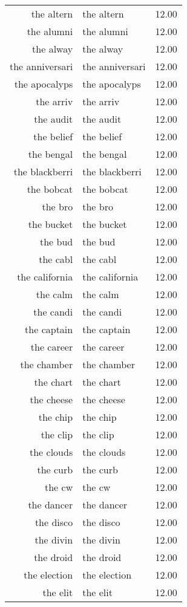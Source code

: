 \begin{table}[ht]
\begin{tabular}{rlr}
  the altern & the altern & 12.00 \\ 
  the alumni & the alumni & 12.00 \\ 
  the alway & the alway & 12.00 \\ 
  the anniversari & the anniversari & 12.00 \\ 
  the apocalyps & the apocalyps & 12.00 \\ 
  the arriv & the arriv & 12.00 \\ 
  the audit & the audit & 12.00 \\ 
  the belief & the belief & 12.00 \\ 
  the bengal & the bengal & 12.00 \\ 
  the blackberri & the blackberri & 12.00 \\ 
  the bobcat & the bobcat & 12.00 \\ 
  the bro & the bro & 12.00 \\ 
  the bucket & the bucket & 12.00 \\ 
  the bud & the bud & 12.00 \\ 
  the cabl & the cabl & 12.00 \\ 
  the california & the california & 12.00 \\ 
  the calm & the calm & 12.00 \\ 
  the candi & the candi & 12.00 \\ 
  the captain & the captain & 12.00 \\ 
  the career & the career & 12.00 \\ 
  the chamber & the chamber & 12.00 \\ 
  the chart & the chart & 12.00 \\ 
  the cheese & the cheese & 12.00 \\ 
  the chip & the chip & 12.00 \\ 
  the clip & the clip & 12.00 \\ 
  the clouds & the clouds & 12.00 \\ 
  the curb & the curb & 12.00 \\ 
  the cw & the cw & 12.00 \\ 
  the dancer & the dancer & 12.00 \\ 
  the disco & the disco & 12.00 \\ 
  the divin & the divin & 12.00 \\ 
  the droid & the droid & 12.00 \\ 
  the election & the election & 12.00 \\ 
  the elit & the elit & 12.00 \\ 

\end{tabular}
\end{table}
